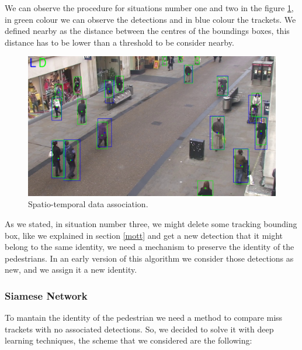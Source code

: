 \documentclass[12pt, a4paper, titlepage,twoside,openright]{article}
\begin{document}
We can observe the procedure for situations number one and two in the figure \ref{data1}, in green colour we can observe the detections and in blue colour the trackets. We defined nearby as the distance between the centres of the boundings boxes, this distance has to be lower than a threshold to be consider nearby. 

\begin{figure}[hptb]
\centering         
\includegraphics[width=12cm]{lucasKanade/dataAssociation.jpg}
\caption{Spatio-temporal data association.} \label{data1}
\end{figure}


As we stated, in situation number three, we might delete some tracking bounding box, like we explained in section \ref{mott} and get a new detection that it might belong to the same identity, we need a mechanism to preserve the identity of the pedestrians. In an early version of this algorithm we consider those detections as new, and we assign it a new identity.





\subsubsection{Siamese Network}


To mantain the identity of the pedestrian we need a method to compare miss trackets with no associated detections. So, we decided to solve it with deep learning techniques, the scheme that we considered are the following:
\end{document}
